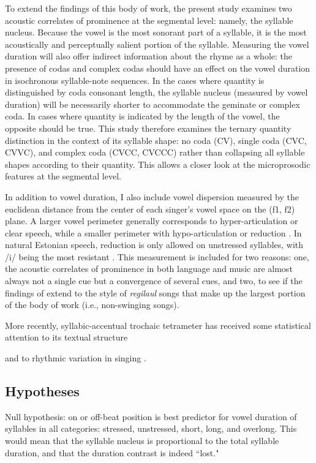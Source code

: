 To extend the findings of this body of work, the present study examines two acoustic correlates of prominence at the segmental level: namely, the syllable nucleus. Because the vowel is the most sonorant part of a syllable, it is the most acoustically and perceptually salient portion of the syllable. Measuring the vowel duration will also offer indirect information about the rhyme as a whole: the presence of codas and complex codas should have an effect on the vowel duration in isochronous syllable-note sequences. In the cases where quantity is distinguished by coda consonant length, the syllable nucleus (measured by vowel duration) will be necessarily shorter to accommodate the geminate or complex coda. In cases where quantity is indicated by the length of the vowel, the opposite should be true. This study therefore examines the ternary quantity distinction in the context of its syllable shape: no coda (CV), single coda (CVC, CVVC), and complex coda (CVCC, CVCCC) rather than collapsing all syllable shapes according to their quantity. This allows a closer look at the microprosodic features at the segmental level. 

In addition to vowel duration, I also include vowel dispersion measured by the euclidean distance from the center of each singer's vowel space on the (f1, f2) plane. A larger vowel perimeter generally corresponds to hyper-articulation or clear speech, while a smaller perimeter with hypo-articulation or reduction \cite{lindblom1990, smiljanic2005}. In natural Estonian speech, reduction is only allowed on unstressed syllables, with /i/ being the most resistant \citep{eekMeister1998}. This measurement is included for two reasons: one, the acoustic correlates of prominence in both language and music are almost always not a single cue but a convergence of several cues, and two, to see if the findings of \citep{ross1992} extend to the style of {\it regilaul} songs that make up the largest portion of the body of work (i.e., non-swinging songs). 


More recently, syllabic-accentual trochaic tetrameter has received some statistical attention to its textual structure \citep{lotmanLotman2013} 

and to rhythmic variation in singing \citep{oras2019}. 
\subsection{Hypotheses}
Null hypothesis: on or off-beat position is best predictor for vowel duration of syllables in all categories: stressed, unstressed, short, long, and overlong. This would mean that the syllable nucleus is proportional to the total syllable duration, and that the duration contrast is indeed ``lost." 

